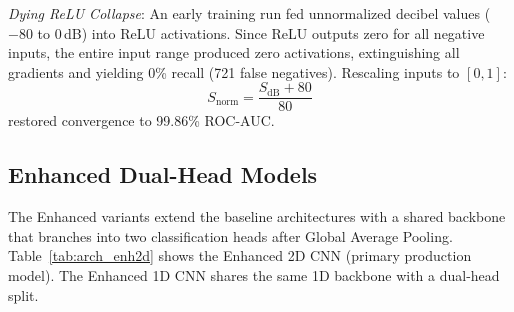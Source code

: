 \documentclass[conference]{IEEEtran}
\begin{document}
\textit{Dying ReLU Collapse}: An early training run fed unnormalized decibel values ($-80$ to $0$\,dB) into ReLU activations. Since ReLU outputs zero for all negative inputs, the entire input range produced zero activations, extinguishing all gradients and yielding 0\% recall (721 false negatives). Rescaling inputs to $[0,1]$:
\begin{equation}
    S_{\text{norm}} = \frac{S_{\text{dB}} + 80}{80}
    \label{eq:norm_db}
\end{equation}
restored convergence to 99.86\% ROC-AUC.

\subsection{Enhanced Dual-Head Models}
The Enhanced variants extend the baseline architectures with a shared backbone that branches into two classification heads after Global Average Pooling. Table~\ref{tab:arch_enh2d} shows the Enhanced 2D CNN (primary production model). The Enhanced 1D CNN shares the same 1D backbone with a dual-head split.
\end{document}
